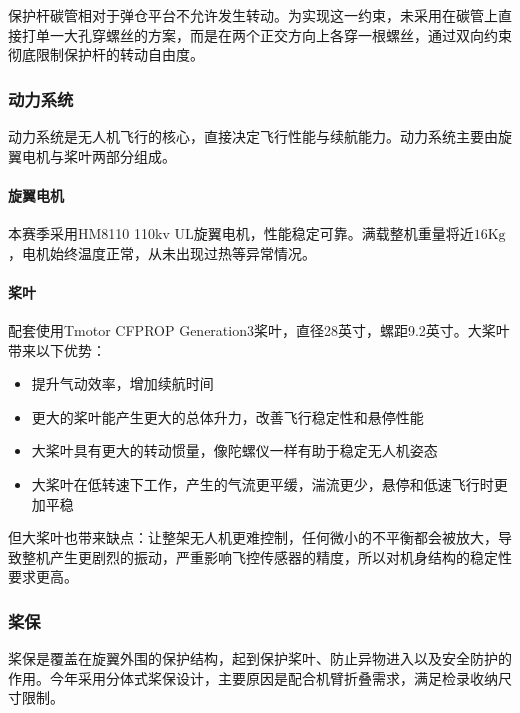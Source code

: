 保护杆碳管相对于弹仓平台不允许发生转动。为实现这一约束，未采用在碳管上直接打单一大孔穿螺丝的方案，而是在两个正交方向上各穿一根螺丝，通过双向约束彻底限制保护杆的转动自由度。

\subsubsection{动力系统}

动力系统是无人机飞行的核心，直接决定飞行性能与续航能力。动力系统主要由旋翼电机与桨叶两部分组成。

\paragraph{旋翼电机}

本赛季采用HM8110 110kv UL旋翼电机，性能稳定可靠。满载整机重量将近$16\mathrm{Kg}$，电机始终温度正常，从未出现过热等异常情况。

\paragraph{桨叶}

配套使用Tmotor CFPROP Generation3桨叶，直径28英寸，螺距9.2英寸。大桨叶带来以下优势：
\begin{itemize}
    \item 提升气动效率，增加续航时间
    \item 更大的桨叶能产生更大的总体升力，改善飞行稳定性和悬停性能
    \item 大桨叶具有更大的转动惯量，像陀螺仪一样有助于稳定无人机姿态
    \item 大桨叶在低转速下工作，产生的气流更平缓，湍流更少，悬停和低速飞行时更加平稳
\end{itemize}

但大桨叶也带来缺点：让整架无人机更难控制，任何微小的不平衡都会被放大，导致整机产生更剧烈的振动，严重影响飞控传感器的精度，所以对机身结构的稳定性要求更高。

\subsubsection{桨保}

桨保是覆盖在旋翼外围的保护结构，起到保护桨叶、防止异物进入以及安全防护的作用。今年采用分体式桨保设计，主要原因是配合机臂折叠需求，满足检录收纳尺寸限制。

